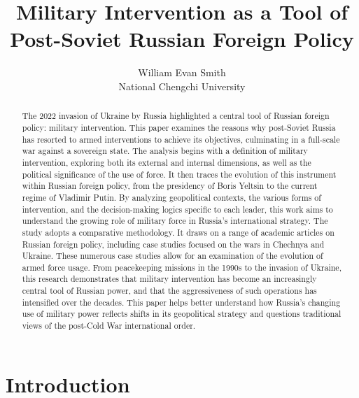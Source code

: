 \documentclass[12pt]{article}
\title{Military Intervention as a Tool of Post-Soviet Russian Foreign Policy}
\author{William Evan Smith\\National Chengchi University}
\date{}
\begin{document}
\maketitle

\begin{abstract}
The 2022 invasion of Ukraine by Russia highlighted a central tool of Russian foreign policy: military intervention. This paper examines the reasons why post-Soviet Russia has resorted to armed interventions to achieve its objectives, culminating in a full-scale war against a sovereign state. The analysis begins with a definition of military intervention, exploring both its external and internal dimensions, as well as the political significance of the use of force. It then traces the evolution of this instrument within Russian foreign policy, from the presidency of Boris Yeltsin to the current regime of Vladimir Putin. By analyzing geopolitical contexts, the various forms of intervention, and the decision-making logics specific to each leader, this work aims to understand the growing role of military force in Russia’s international strategy. The study adopts a comparative methodology. It draws on a range of academic articles on Russian foreign policy, including case studies focused on the wars in Chechnya and Ukraine. These numerous case studies allow for an examination of the evolution of armed force usage. From peacekeeping missions in the 1990s to the invasion of Ukraine, this research demonstrates that military intervention has become an increasingly central tool of Russian power, and that the aggressiveness of such operations has intensified over the decades. This paper helps better understand how Russia’s changing use of military power reflects shifts in its geopolitical strategy and questions traditional views of the post-Cold War international order.
\end{abstract}
\newpage
\section*{Introduction}
\end{document}
